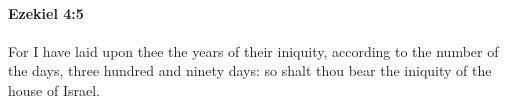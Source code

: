
		\paragraph{Ezekiel 4:5} %
			\label{EZEKIEL-4-5}

			For I have laid upon thee the years of their iniquity, according to the number of the days, three hundred and ninety days: so shalt thou bear the iniquity of the house of Israel.



